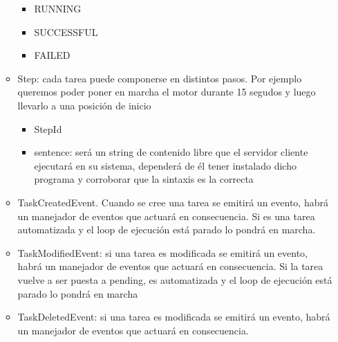 \begin{itemize}
\begin{itemize}
\begin{itemize}
            \item RUNNING
            \item SUCCESSFUL
            \item FAILED
        \end{itemize}
        \item Step: cada tarea puede componerse en distintos pasos. Por ejemplo queremos poder poner en marcha el motor durante 15 segudos y luego llevarlo a una posición de inicio
        \begin{itemize}
            \item StepId
            \item sentence: será un string de contenido libre que el servidor cliente ejecutará en su sistema, dependerá de él tener instalado dicho programa y corroborar que la sintaxis es la correcta
        \end{itemize}
        \item TaskCreatedEvent. Cuando se cree una tarea se emitirá un evento, habrá un manejador de eventos que actuará en consecuencia. Si es una tarea automatizada y el loop de ejecución está parado lo pondrá en marcha.
        \item TaskModifiedEvent: si una tarea es modificada se emitirá un evento, habrá un manejador de eventos que actuará en consecuencia. Si la tarea vuelve a ser puesta a pending, es automatizada y el loop de ejecución está parado lo pondrá en marcha
        \item TaskDeletedEvent: si una tarea es modificada se emitirá un evento, habrá un manejador de eventos que actuará en consecuencia.
    \end{itemize}

\end{itemize}

